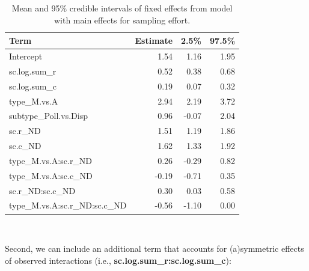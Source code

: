 \documentclass[11pt,]{article}
\begin{document}
\begin{table}[!h]

\caption{\label{tab:subset-sampling-table}Mean and 95\% credible intervals of fixed effects from model with main effects for sampling effort.}
\centering
\begin{tabular}{lrrr}
\toprule
Term & Estimate & 2.5\% & 97.5\%\\
\midrule
\rowcolor{gray!6}  Intercept & 1.54 & 1.16 & 1.95\\
sc.log.sum\_r & 0.52 & 0.38 & 0.68\\
\rowcolor{gray!6}  sc.log.sum\_c & 0.19 & 0.07 & 0.32\\
type\_M.vs.A & 2.94 & 2.19 & 3.72\\
\rowcolor{gray!6}  subtype\_Poll.vs.Disp & 0.96 & -0.07 & 2.04\\
sc.r\_ND & 1.51 & 1.19 & 1.86\\
\rowcolor{gray!6}  sc.c\_ND & 1.62 & 1.33 & 1.92\\
type\_M.vs.A:sc.r\_ND & 0.26 & -0.29 & 0.82\\
\rowcolor{gray!6}  type\_M.vs.A:sc.c\_ND & -0.19 & -0.71 & 0.35\\
sc.r\_ND:sc.c\_ND & 0.30 & 0.03 & 0.58\\
\rowcolor{gray!6}  type\_M.vs.A:sc.r\_ND:sc.c\_ND & -0.56 & -1.10 & 0.00\\
\bottomrule
\end{tabular}
\end{table}

~

Second, we can include an additional term that accounts for (a)symmetric
effects of observed interactions (i.e.,
\textbf{sc.log.sum\_r:sc.log.sum\_c}):
\end{document}
